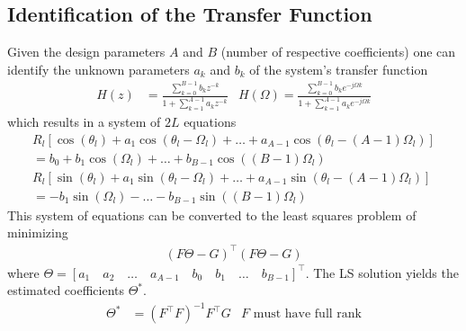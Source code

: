 \subsection{Identification of the Transfer Function}
Given the design parameters $A$ and $B$ (number of respective coefficients) one can identify the unknown parameters $a_k$ and $b_k$ of the system's transfer function
\begin{align*}
	H(z) &= \frac{\sum_{k=0}^{B-1}b_kz^{-k}}{1+\sum_{k=1}^{A-1}a_kz^{-k}} & H(\Omega) = \frac{\sum_{k=0}^{B-1}b_ke^{-j\Omega k}}{1+\sum_{k=1}^{A-1}a_ke^{-j\Omega k}}
\end{align*}
which results in a system of $2L$ equations
\begin{align*}
	R_l[\cos(\theta_l) + a_1\cos(\theta_l-\Omega_l) + \hdots + a_{A-1}\cos(\theta_l-(A-1)\Omega_l)] \\ =b_0 + b_1 \cos(\Omega_l) + \hdots + b_{B-1}\cos((B-1)\Omega_l) \\
	R_l[\sin(\theta_l) + a_1\sin(\theta_l-\Omega_l) + \hdots + a_{A-1}\sin(\theta_l-(A-1)\Omega_l)] \\ =-b_1 \sin(\Omega_l) - \hdots - b_{B-1}\sin((B-1)\Omega_l)
\end{align*}
This system of equations can be converted to the least squares problem of minimizing
\begin{align*}
	(F\Theta - G)^\top (F\Theta - G)
\end{align*}
where $\Theta = [a_1\quad a_2\quad\hdots\quad a_{A-1} \quad b_0 \quad b_1 \quad\hdots \quad b_{B-1}]^\top$. The LS solution yields the estimated coefficients $\Theta^*$. 
\begin{align*}
	\Theta^* &= (F^\top F)^{-1} F^\top G & \text{$F$ must have full rank}
\end{align*}

